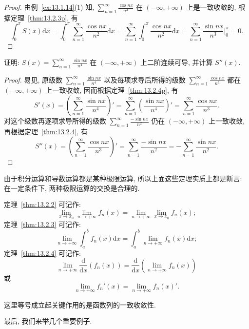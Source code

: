 \begin{proof}
由例~\ref{ex:13.1.14}(1) 知, $\sum_{n=1}^{\infty}\frac{\cos nx}{n^{2}}$ 在 $(-\infty,+\infty)$ 上是一致收敛的, 根据定理~\ref{thm:13.2.3p}, 有
\[
  \int_{0}^{\pi}S(x)\mathrm{d}x=\int_{0}^{\pi}\sum_{n=1}^{\infty}\frac{\cos nx}{n^{2}}\mathrm{d}x=\sum_{n=1}^{\infty}\int_{0}^{\pi}\frac{\cos nx}{n^{2}}\mathrm{d}x=\sum_{n=1}^{\infty}\frac{\sin nx}{n^{3}}\bigg|_{0}^{\pi}=0.
\]
\end{proof}

\begin{example}\label{ex:13.2.11}
证明: $S(x)=\sum_{n=1}^{\infty}\frac{\sin nx}{n^{4}}$ 在 $(-\infty,+\infty)$ 上二阶连续可导, 并计算 $S''(x)$.
\end{example}

\begin{proof}
易见, 原级数 $\sum_{n=1}^{\infty}\frac{\sin nx}{n^{4}}$ 以及每项求导后所得的级数 $\sum_{n=1}^{\infty}\frac{\cos nx}{n^{3}}$ 都在 $(-\infty,+\infty)$ 上一致收敛, 因而根据定理~\ref{thm:13.2.4p}, 有
\[
  S'(x)=\left(\sum_{n=1}^{\infty}\frac{\sin nx}{n^{4}}\right)'=\sum_{n=1}^{\infty}\left(\frac{\sin nx}{n^{4}}\right)'=\sum_{n=1}^{\infty}\frac{\cos nx}{n^{3}}.
\]
对这个级数再逐项求导所得的级数 $\sum_{n=1}^{\infty}\frac{-\sin nx}{n^{2}}$ 仍在 $(-\infty,+\infty)$ 上一致收敛, 再根据定理~\ref{thm:13.2.4}, 有
\[
  S''(x)=\left(\sum_{n=1}^{\infty}\frac{\cos nx}{n^{3}}\right)'=\sum_{n=1}^{\infty}\frac{-\sin nx}{n^{2}}=-\sum_{n=1}^{\infty}\frac{\sin nx}{n^{2}}.
\]
\end{proof}

由于积分运算和导数运算都是某种极限运算, 所以上面这些定理实质上都是断言: 在一定条件下, 两种极限运算的交换是合理的.

定理~\ref{thm:13.2.2} 可记作:
\[
  \lim_{x\to x_{0}}\lim_{n\to+\infty}f_{n}(x)=\lim_{n\to+\infty}\lim_{x\to x_{0}}f_{n}(x);
\]
定理~\ref{thm:13.2.3} 可记作:
\[
  \lim_{n\to+\infty}\int_{a}^{b}f_{n}(x)\mathrm{d}x=\int_{a}^{b}\lim_{n\to+\infty}f_{n}(x)\mathrm{d}x;
\]
定理~\ref{thm:13.2.4} 可记作:
\[
  \lim_{n\to+\infty}\frac{\mathrm{d}}{\mathrm{d}x}(f_{n}(x))=\frac{\mathrm{d}}{\mathrm{d}x}(\lim_{n\to+\infty}f_{n}(x))
\]
或
\[
  \lim_{n\to+\infty}f_{n}'(x)=\lim_{n\to+\infty}f_{n}(x)'.
\]

这里等号成立起关键作用的是函数列的一致收敛性.

最后, 我们来举几个重要例子.


